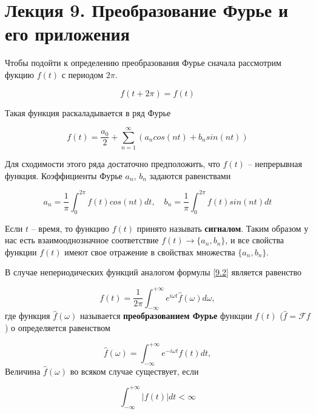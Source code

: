 \section{Лекция 9. Преобразование Фурье и его приложения}
Чтобы подойти к определению преобразования Фурье сначала рассмотрим фукцию $f(t)$ с периодом $2\pi$.

\begin{equation}\label{9.1}
	f(t+2\pi) = f(t)
\end{equation}

Такая функция раскаладывается в ряд Фурье 

\begin{equation}\label{9.2}
f(t) = \frac{a_0}{2} + \sum_{n = 1}^{\infty}(a_n cos(nt) + b_n sin(nt)) 
\end{equation}

Для сходимости этого ряда достаточно предположить, что $f(t)$ -- непрерывная функция.
Коэффициенты Фурье $a_n$, $b_n$ задаются равенствами

\begin{equation}\label{9.3}
a_n = \frac{1}{\pi} \int_{0}^{2\pi} f(t) cos(nt) dt,\quad b_n = \frac{1}{\pi} \int_{0}^{2\pi} f(t) sin(nt) dt
\end{equation} 

Если $t$ -- время, то функцию $f(t)$ принято называть \textbf{сигналом}. 
Таким образом у нас есть взаимооднозначное соответствие $f(t) \rightarrow \{a_n, b_n\}$, и все свойства функции $f(t)$ имеют свое отражение в свойствах множества $\{a_n, b_n\}$.

В случае непериодических функций аналогом формулы \ref{9.2} является равенство 

\begin{equation}\label{9.4}
f(t) = \frac{1}{2\pi}\int_{-\infty}^{+\infty} e^{i\omega t} \hat{f} (\omega) d\omega,
\end{equation}
где функция $\hat{f}(\omega)$ называется \textbf{преобразованием Фурье} функции $f(t)$ ($ \hat{f} = \mathscr{F} f$)
о определяется равенством 

\begin{equation}\label{9.5}
\hat{f} (\omega) = \int_{-\infty}^{+\infty} e^{-i\omega t} f(t) dt,
\end{equation}
Величина $\hat{f} (\omega)$ во всяком случае существует, если 

\begin{equation}\label{9.6}
\int_{-\infty}^{+\infty} |f(t)| dt < \infty
\end{equation}

